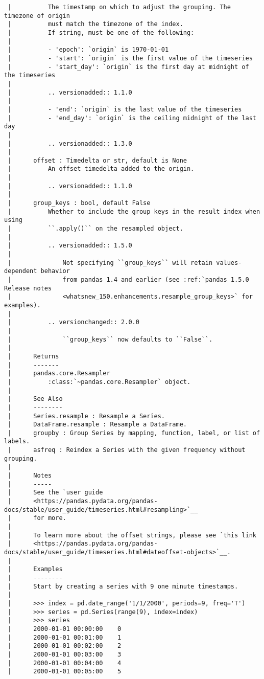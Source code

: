 \documentclass[
  letterpaper,
  DIV=11,
  numbers=noendperiod]{scrreprt}
\begin{document}
\begin{verbatim}
 |          The timestamp on which to adjust the grouping. The timezone of origin
 |          must match the timezone of the index.
 |          If string, must be one of the following:
 |      
 |          - 'epoch': `origin` is 1970-01-01
 |          - 'start': `origin` is the first value of the timeseries
 |          - 'start_day': `origin` is the first day at midnight of the timeseries
 |      
 |          .. versionadded:: 1.1.0
 |      
 |          - 'end': `origin` is the last value of the timeseries
 |          - 'end_day': `origin` is the ceiling midnight of the last day
 |      
 |          .. versionadded:: 1.3.0
 |      
 |      offset : Timedelta or str, default is None
 |          An offset timedelta added to the origin.
 |      
 |          .. versionadded:: 1.1.0
 |      
 |      group_keys : bool, default False
 |          Whether to include the group keys in the result index when using
 |          ``.apply()`` on the resampled object.
 |      
 |          .. versionadded:: 1.5.0
 |      
 |              Not specifying ``group_keys`` will retain values-dependent behavior
 |              from pandas 1.4 and earlier (see :ref:`pandas 1.5.0 Release notes
 |              <whatsnew_150.enhancements.resample_group_keys>` for examples).
 |      
 |          .. versionchanged:: 2.0.0
 |      
 |              ``group_keys`` now defaults to ``False``.
 |      
 |      Returns
 |      -------
 |      pandas.core.Resampler
 |          :class:`~pandas.core.Resampler` object.
 |      
 |      See Also
 |      --------
 |      Series.resample : Resample a Series.
 |      DataFrame.resample : Resample a DataFrame.
 |      groupby : Group Series by mapping, function, label, or list of labels.
 |      asfreq : Reindex a Series with the given frequency without grouping.
 |      
 |      Notes
 |      -----
 |      See the `user guide
 |      <https://pandas.pydata.org/pandas-docs/stable/user_guide/timeseries.html#resampling>`__
 |      for more.
 |      
 |      To learn more about the offset strings, please see `this link
 |      <https://pandas.pydata.org/pandas-docs/stable/user_guide/timeseries.html#dateoffset-objects>`__.
 |      
 |      Examples
 |      --------
 |      Start by creating a series with 9 one minute timestamps.
 |      
 |      >>> index = pd.date_range('1/1/2000', periods=9, freq='T')
 |      >>> series = pd.Series(range(9), index=index)
 |      >>> series
 |      2000-01-01 00:00:00    0
 |      2000-01-01 00:01:00    1
 |      2000-01-01 00:02:00    2
 |      2000-01-01 00:03:00    3
 |      2000-01-01 00:04:00    4
 |      2000-01-01 00:05:00    5

\end{verbatim}
\end{document}
